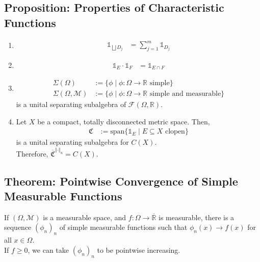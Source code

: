 \documentclass[9pt]{extarticle}
\newcommand{\R}{\mathbb{R}}
\newcommand{\norm}[1]{\left\Vert #1 \right\Vert}
\begin{document}
  \subsection{Proposition: Properties of Characteristic Functions}%
  \begin{enumerate}[(1)]
    \item 
      \begin{align*}
        \mathbb{1}_{\bigsqcup D_j} &= \sum_{j=1}^{m}\mathbb{1}_{D_j}
      \end{align*}
    \item 
      \begin{align*}
        \mathbb{1}_E \cdot \mathbb{1}_F &= \mathbb{1}_{E\cap F}
      \end{align*}
    \item 
      \begin{align*}
        \Sigma(\Omega) &:= \{\phi\mid \phi: \Omega \rightarrow \R \text{ simple}\}\\
        \Sigma(\Omega,\mathcal{M}) &:= \{\phi\mid \phi: \Omega \rightarrow \R \text{ simple and measurable}\}
      \end{align*}
      is a unital separating subalgebra of $\mathcal{F}(\Omega,\R)$.
    \item Let $X$ be a compact, totally disconnected metric space. Then,
      \begin{align*}
        \mathfrak{C} &:= \text{span}\{\mathbb{1}_{E}\mid E\subseteq X\text{ clopen}\}
      \end{align*}
      is a unital separating subalgebra for $C(X)$.\\

      Therefore, $\overline{\mathfrak{C}}^{\norm{\cdot}_u} = C(X)$.
  \end{enumerate}
  \subsection{Theorem: Pointwise Convergence of Simple Measurable Functions}%
  If $(\Omega,\mathcal{M})$ is a measurable space, and $f: \Omega \rightarrow \overline{\R}$ is measurable, there is a sequence $(\phi_n)_n$ of simple measurable functions such that $\phi_n(x) \rightarrow f(x)$ for all $x\in \Omega$.\\

  If $f \geq 0$, we can take $(\phi_n)_n$ to be pointwise increasing.\\
\end{document}
